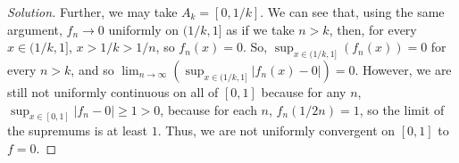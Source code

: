 \documentclass[10pt]{article}
\begin{document}
\begin{proof}[Solution]
Further, we may take $A_k = [0,1/k]$. We can see that, using the same argument, $f_n \to 0$ uniformly on $(1/k,1]$ as if we take $n > k$, then, for every $x \in (1/k,1]$, $x > 1/k > 1/n$, so $f_n(x) = 0$. So, $\sup_{x \in (1/k,1]} (f_n(x)) = 0$ for every $n > k$, and so $\lim_{n \to \infty} ( \sup_{x \in (1/k,1]} |f_n(x) - 0|) = 0$. However, we are still not uniformly continuous on all of $[0,1]$ because for any $n$, $\sup_{x \in [0,1]} | f_n  - 0|  \geq 1 > 0$, because for each $n$, $f_n(1/2n) = 1$, so the limit of the supremums is at least $1$. Thus, we are not uniformly convergent on $[0,1]$ to $f = 0$.

\end{proof}
 
\end{document}
